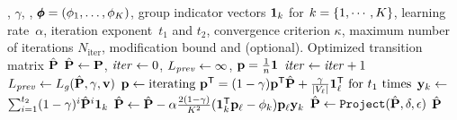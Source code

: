 



\begin{algorithm}
\caption{\label{alg:crossgd}\crossgd: Projected gradient descent for Group-adapted \phiPageRank and Restricted Group-adapted \phiPageRank}
  \begin{algorithmic}[1]
    \REQUIRE \transmatrix, $\gamma$, \vectv, 
$\pmb{\phi} =(\phi_1, \ldots, \phi_K)$, group indicator vectors $\mathbf{{1}}_{k}$ for $k = \{1, \cdots, K\}$, learning rate~$\alpha$, iteration exponent~$t_1$ and $t_2$, convergence criterion $\kappa$, maximum number of iterations $N_{\text{iter}}$, modification bound \boundfactor and \absboundfactor (optional).
    \ENSURE Optimized transition matrix $\hat{\mathbf{{P}}}$
    \STATE $\hat{\mathbf{{P}}} \gets \mathbf{{P}}$, ${{\mathit{iter}}} \gets 0$, ${L_{\mathit{prev}}} \gets \infty$, $\mathbf{{p}} = \frac{1}{n} \mathbf{{1}}_{}$
      \STATE ${\mathit{iter}} \gets {\mathit{iter}} + 1$
      \STATE ${L_{\mathit{prev}}} \gets L_{\mathit{g}}(\hat{\mathbf{{P}}}, \gamma, \mathbf{{v}})$
       \STATE $\mathbf{{p}} \gets \text{iterating } \mathbf{{p}}^{\mathsf{T}} = (1 - \gamma) \mathbf{{p}}^{\mathsf{T}} \hat{\mathbf{{P}}} + \frac{\gamma}{|V_{\ell}|} \mathbf{{1}}_{\ell}^{\mathsf{T}} \text{ for } t_1 \text{ times}$
           \STATE $\mathbf{{y}}_{k} \gets$ $\sum_{i=1}^{t_2} (1-\gamma)^i \hat{\mathbf{{P}}}^i \mathbf{{1}}_{k}$          
            \STATE $\hat{\mathbf{{P}}} \gets \hat{\mathbf{{P}}}- \alpha \frac{2(1 - \gamma)}{K^2} (\mathbf{{1}}_{k}^{\mathsf{T}} \mathbf{{p}}_{\ell} - \phi_k) \mathbf{{p}}_{\ell} \mathbf{{y}}_{k}$
        \ENDFOR
      \ENDFOR
      \STATE $\hat{\mathbf{{P}}} \gets {{\texttt{Project}}}(\hat{\mathbf{{P}}}, \delta, \epsilon)$
    \ENDWHILE
    \RETURN $\hat{\mathbf{{P}}}$
  \end{algorithmic}
\end{algorithm}














